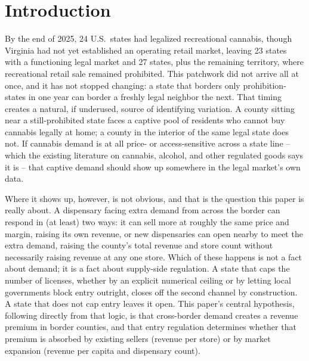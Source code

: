 \documentclass[12pt]{article}
\begin{document}
\section{Introduction}
\label{sec:intro}

By the end of 2025, 24 U.S.\ states had legalized recreational cannabis, though Virginia had not yet
established an operating retail market, leaving 23 states with a functioning legal market and 27 states,
plus the remaining territory, where recreational retail sale remained prohibited. This patchwork did not
arrive all at once, and it has not stopped changing: a state that borders only prohibition-states in one year
can border a freshly legal neighbor the next. That timing creates a natural, if underused, source of
identifying variation. A county sitting near a still-prohibited state faces a captive pool of residents who
cannot buy cannabis legally at home; a county in the interior of the same legal state does not. If cannabis
demand is at all price- or access-sensitive across a state line -- which the existing literature on cannabis,
alcohol, and other regulated goods says it is -- that captive demand should show up somewhere in the legal
market's own data.

Where it shows up, however, is not obvious, and that is the question this paper is really about. A dispensary
facing extra demand from across the border can respond in (at least) two ways: it can sell more at roughly the
same price and margin, raising its own revenue, or new dispensaries can open nearby to meet the extra demand,
raising the county's total revenue and store count without necessarily raising revenue at any one store. Which
of these happens is not a fact about demand; it is a fact about supply-side regulation. A state that caps the
number of licenses, whether by an explicit numerical ceiling or by letting local governments block entry
outright, closes off the second channel by construction. A state that does not cap entry leaves it open. This
paper's central hypothesis, following directly from that logic, is that cross-border demand creates a revenue
premium in border counties, and that entry regulation determines whether that premium is absorbed by existing
sellers (revenue per store) or by market expansion (revenue per capita and dispensary count).
\end{document}
